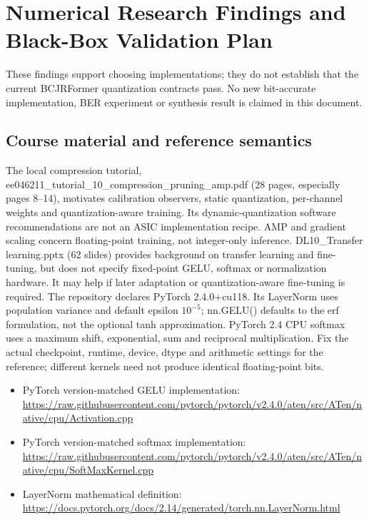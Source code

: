 \section{Numerical Research Findings and Black-Box Validation Plan}
These findings support choosing implementations; they do not establish that the current BCJRFormer quantization contracts pass. No new bit-accurate implementation, BER experiment or synthesis result is claimed in this document.

\subsection{Course material and reference semantics}
The local compression tutorial, ee046211\_tutorial\_10\_compression\_pruning\_amp.pdf (28 pages, especially pages 8--14), motivates calibration observers, static quantization, per-channel weights and quantization-aware training. Its dynamic-quantization software recommendations are not an ASIC implementation recipe. AMP and gradient scaling concern floating-point training, not integer-only inference.
DL10\_Transfer learning.pptx (62 slides) provides background on transfer learning and fine-tuning, but does not specify fixed-point GELU, softmax or normalization hardware. It may help if later adaptation or quantization-aware fine-tuning is required.
The repository declares PyTorch 2.4.0+cu118. Its LayerNorm uses population variance and default epsilon $10^{-5}$; nn.GELU() defaults to the erf formulation, not the optional tanh approximation. PyTorch 2.4 CPU softmax uses a maximum shift, exponential, sum and reciprocal multiplication. Fix the actual checkpoint, runtime, device, dtype and arithmetic settings for the reference; different kernels need not produce identical floating-point bits.
\begin{itemize}
\item PyTorch version-matched GELU implementation: \url{https://raw.githubusercontent.com/pytorch/pytorch/v2.4.0/aten/src/ATen/native/cpu/Activation.cpp}
\item PyTorch version-matched softmax implementation: \url{https://raw.githubusercontent.com/pytorch/pytorch/v2.4.0/aten/src/ATen/native/cpu/SoftMaxKernel.cpp}
\item LayerNorm mathematical definition: \url{https://docs.pytorch.org/docs/2.14/generated/torch.nn.LayerNorm.html}
\end{itemize}


